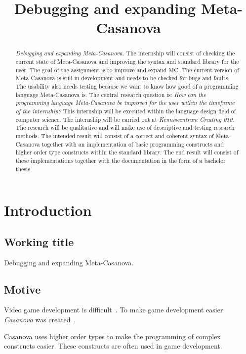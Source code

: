 



\title{Debugging and expanding Meta-Casanova}
\author{\writer}

\begin{titlepage}
   
\end{titlepage}

\begin{abstract}
   \emph{Debugging and expanding Meta-Casanova.}
   The internship will consist of checking the current state of Meta-Casanova and improving the syntax and standard library for the user.
   The goal of the assignment is to improve and expand MC.
   The current version of Meta-Casanova is still in development and needs to be checked for bugs and faults.
   The usability also needs testing because we want to know how good of a programming language Meta-Casanova is.
   The central research question is: \emph{How can the programming language Meta-Casanova be improved for the user within the timeframe of the internship?}
   This internship will be executed within the language design field of computer science.
   The internship will be carried out at \emph{Kenniscentrum Creating 010}.
   The research will be qualitative and will make use of descriptive and testing research methods.
   The intended result will consist of a correct and coherent syntax of Meta-Casanova together with an implementation of basic programming constructs and higher order type constructs within the standard library.
   The end result will consist of these implementations together with the documentation in the form of a bachelor thesis.
\end{abstract}

\section{Introduction}
\subsection{Working title}
Debugging and expanding Meta-Casanova.

\subsection{Motive}
Video game development is difficult~\cite{blow2004game}.
To make game development easier \emph{Casanova} was created~\cite{maggiore2011designing}.

Casanova uses higher order types to make the programming of complex constructs easier.
These constructs are often used in game development.

